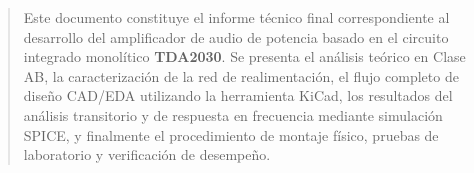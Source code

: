\documentclass[11pt, a4paper]{article}
\begin{document}



\newpage
{}

\begin{abstract}
\noindent Este documento constituye el informe técnico final correspondiente al desarrollo del amplificador de audio de potencia basado en el circuito integrado monolítico \textbf{TDA2030}. Se presenta el análisis teórico en Clase AB, la caracterización de la red de realimentación, el flujo completo de diseño CAD/EDA utilizando la herramienta KiCad, los resultados del análisis transitorio y de respuesta en frecuencia mediante simulación SPICE, y finalmente el procedimiento de montaje físico, pruebas de laboratorio y verificación de desempeño.
\end{abstract}

\vspace{1.5em}

{
  \hypersetup{linkcolor=darktext} %
  \renewcommand{\contentsname}{\large\bfseries\color{primary}ÍNDICE GENERAL}
  \tableofcontents
}

\newpage
{}






%
\newpage

\end{document}
